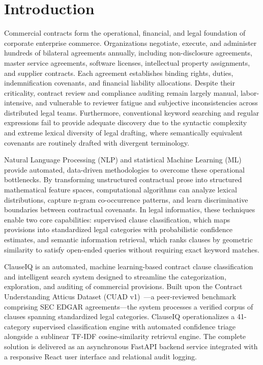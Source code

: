 \chapter{Introduction}
\label{ch:introduction}

Commercial contracts form the operational, financial, and legal foundation of corporate enterprise commerce. Organizations negotiate, execute, and administer hundreds of bilateral agreements annually, including non-disclosure agreements, master service agreements, software licenses, intellectual property assignments, and supplier contracts. Each agreement establishes binding rights, duties, indemnification covenants, and financial liability allocations. Despite their criticality, contract review and compliance auditing remain largely manual, labor-intensive, and vulnerable to reviewer fatigue and subjective inconsistencies across distributed legal teams. Furthermore, conventional keyword searching and regular expressions fail to provide adequate discovery due to the syntactic complexity and extreme lexical diversity of legal drafting, where semantically equivalent covenants are routinely drafted with divergent terminology.

Natural Language Processing (NLP) and statistical Machine Learning (ML) provide automated, data-driven methodologies to overcome these operational bottlenecks. By transforming unstructured contractual prose into structured mathematical feature spaces, computational algorithms can analyze lexical distributions, capture n-gram co-occurrence patterns, and learn discriminative boundaries between contractual covenants. In legal informatics, these techniques enable two core capabilities: supervised clause classification, which maps provisions into standardized legal categories with probabilistic confidence estimates, and semantic information retrieval, which ranks clauses by geometric similarity to satisfy open-ended queries without requiring exact keyword matches.

ClauseIQ is an automated, machine learning-based contract clause classification and intelligent search system designed to streamline the categorization, exploration, and auditing of commercial provisions. Built upon the Contract Understanding Atticus Dataset (CUAD v1)~\cite{hendrycks2021cuad}---a peer-reviewed benchmark comprising \TotalContracts{} SEC EDGAR agreements---the system processes a verified corpus of \TotalClauses{} clauses spanning \NumClasses{} standardized legal categories. ClauseIQ operationalizes a 41-category supervised classification engine with automated confidence triage alongside a sublinear TF-IDF cosine-similarity retrieval engine. The complete solution is delivered as an asynchronous FastAPI backend service integrated with a responsive React user interface and relational audit logging.


